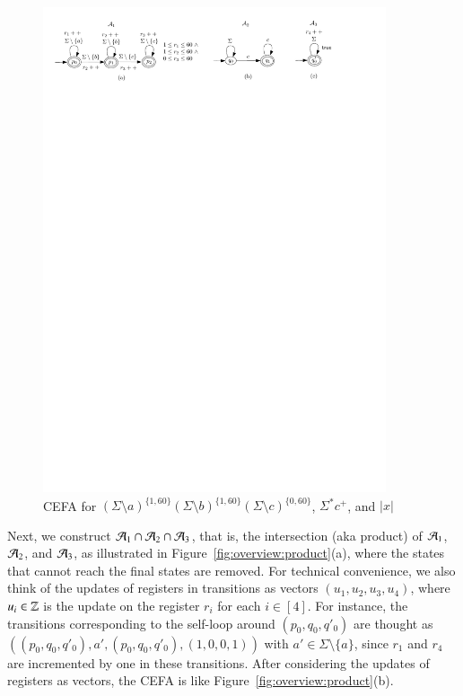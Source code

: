 \begin{figure}[ht]
\vspace{-3mm}
  \centering
  \includegraphics[width = 0.9\textwidth]{sections/overview-cefa.pdf}
  \caption{CEFA for $(\Sigma \setminus a)^{\{1, 60\}} (\Sigma \setminus b)^{\{1, 60\}} (\Sigma \setminus c)^{\{0, 60\}}$, $\Sigma^* c^+$, and $|x|$}
  \label{fig:overview}
\vspace{-3mm}
\end{figure}

Next, 
we construct $\mathcal{A}_1 \cap \mathcal{A}_2 \cap \mathcal{A}_3$, that is, the intersection (aka product) of $\mathcal{A}_1$, $\mathcal{A}_2$, and $\mathcal{A}_3$, as illustrated in Figure~\ref{fig:overview:product}(a), where the states that cannot reach the final states are removed. 
For technical convenience, we also think of the updates of registers in transitions as vectors $(u_1, u_2, u_3, u_4)$, where $u_i \in \mathbb{Z}$ is the update on the register $r_{i}$ for each $i \in [4]$. For instance, the transitions corresponding to the self-loop around $(p_0, q_0, q'_0)$ are thought as $((p_0, q_0, q'_0), a', (p_0, q_0, q'_0), (1,0,0,1))$ with $a' \in \Sigma \setminus \{a\}$, since $r_1$ and $r_4$ are incremented by one in these transitions. After considering the updates of registers as vectors, the CEFA is like Figure~\ref{fig:overview:product}(b).

